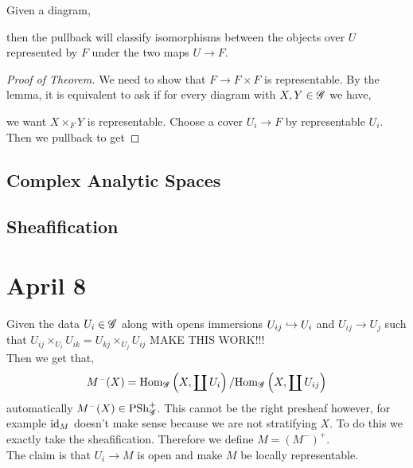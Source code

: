 \documentclass[12pt]{article}
\begin{document}
\begin{rmk}
Given a diagram,
\begin{center}
\end{center}
then the pullback will classify isomorphisms between the objects over $U$ represented by $F$ under the two maps $U \to F$. 
\end{rmk}

\begin{proof}[Proof of Theorem]
We need to show that $F \to F \times F$ is representable. By the lemma, it is equivalent to ask if for every diagram with $X, Y \in \mathscr{G}$ we have,
\begin{center}
\end{center}
we want $X \times_F Y$ is representable. Choose a cover $U_i \to F$ by representable $U_i$. Then we pullback to get
\end{proof}

\subsection{Complex Analytic Spaces}

\subsection{Sheafification}

\section{April 8}

Given the data $U_i \in \mathscr{G}$ along with opens immersions $U_{ij} \hookrightarrow U_i$ and $U_{ij} \to U_j$ such that $U_{ij} \times_{U_i} U_{ik} = U_{kj} \times_{U_j} U_{ij}$ MAKE THIS WORK!!!
\bigskip\\
Then we get that,
\[ M^-(X) = \mathrm{Hom}_{\mathscr{G}} \left( X, \coprod U_i \right) / \mathrm{Hom}_{\mathscr{G}} \left( X, \coprod U_{ij} \right) \]
automatically $M^-(X) \in \mathrm{PSh}^+_{\mathscr{G}}$. This cannot be the right presheaf however, for example $\mathrm{id}_M$ doesn't make sense because we are not stratifying $X$. To do this we exactly take the sheafification. Therefore we define $M = (M^-)^+$. 
\bigskip\\
The claim is that $U_i \to M$ is open and make $M$ be locally representable. 
\end{document}
